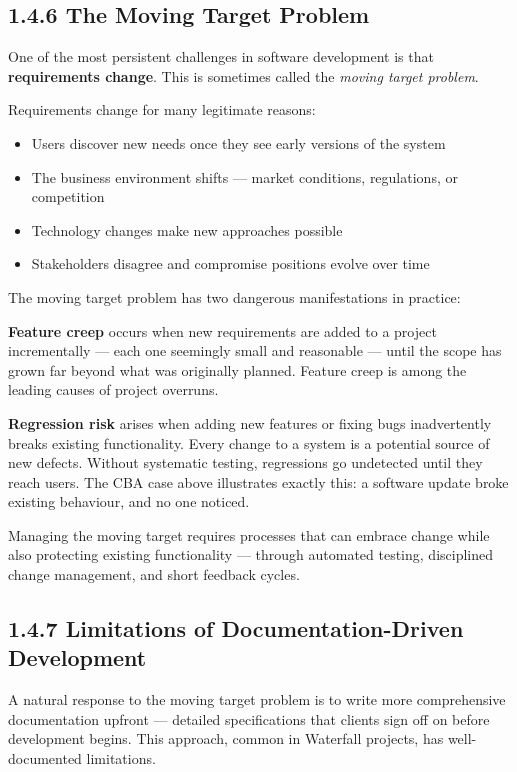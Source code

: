 \documentclass[11pt,a4paper]{book}
\begin{document}
\subsection{1.4.6 The Moving Target Problem}

One of the most persistent challenges in software development is that \textbf{requirements change}. This is sometimes called the \textit{moving target problem}.

Requirements change for many legitimate reasons:

\begin{itemize}
  \item Users discover new needs once they see early versions of the system
  \item The business environment shifts --- market conditions, regulations, or competition
  \item Technology changes make new approaches possible
  \item Stakeholders disagree and compromise positions evolve over time
\end{itemize}

The moving target problem has two dangerous manifestations in practice:

\textbf{Feature creep} occurs when new requirements are added to a project incrementally --- each one seemingly small and reasonable --- until the scope has grown far beyond what was originally planned. Feature creep is among the leading causes of project overruns.

\textbf{Regression risk} arises when adding new features or fixing bugs inadvertently breaks existing functionality. Every change to a system is a potential source of new defects. Without systematic testing, regressions go undetected until they reach users. The CBA case above illustrates exactly this: a software update broke existing behaviour, and no one noticed.

Managing the moving target requires processes that can embrace change while also protecting existing functionality --- through automated testing, disciplined change management, and short feedback cycles.

\subsection{1.4.7 Limitations of Documentation-Driven Development}

A natural response to the moving target problem is to write more comprehensive documentation upfront --- detailed specifications that clients sign off on before development begins. This approach, common in Waterfall projects, has well-documented limitations.
\end{document}
